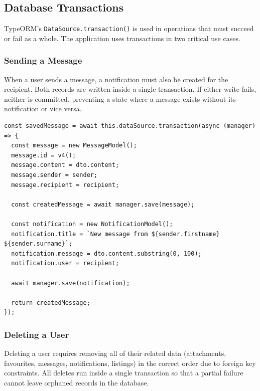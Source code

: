 \documentclass[12pt, a4paper]{article}
\begin{document}
\subsection{Database Transactions}

TypeORM's \texttt{DataSource.transaction()} is used in operations that must succeed or fail as a whole. The application uses transactions in two critical use cases.

\subsubsection{Sending a Message}

When a user sends a message, a notification must also be created for the recipient. Both records are written inside a single transaction. If either write fails, neither is committed, preventing a state where a message exists without its notification or vice versa.

\begin{lstlisting}[style=code, language={[Sharp]C}, caption=CreateMessageUseCase — transactional write]
const savedMessage = await this.dataSource.transaction(async (manager) => {
  const message = new MessageModel();
  message.id = v4();
  message.content = dto.content;
  message.sender = sender;
  message.recipient = recipient;

  const createdMessage = await manager.save(message);

  const notification = new NotificationModel();
  notification.title = `New message from ${sender.firstname} ${sender.surname}`;
  notification.message = dto.content.substring(0, 100);
  notification.user = recipient;

  await manager.save(notification);

  return createdMessage;
});
\end{lstlisting}

\subsubsection{Deleting a User}

Deleting a user requires removing all of their related data (attachments, favourites, messages, notifications, listings) in the correct order due to foreign key constraints. All deletes run inside a single transaction so that a partial failure cannot leave orphaned records in the database.
\end{document}
